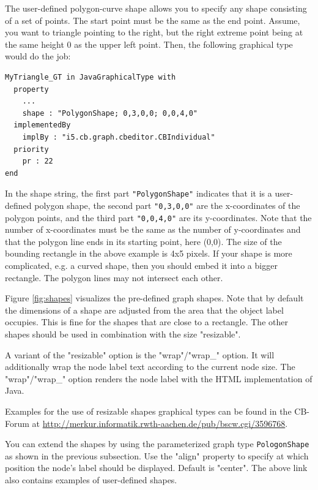 \vspace{0.7cm}


The user-defined polygon-curve shape allows you to specify any shape consisting of a 
set of points. The start point must be the same as the end point.
Assume, you want to triangle pointing to the right, but the right extreme point being at the same height 0
as the upper left point. Then, the following graphical type would do
the job:

{\small
\begin{verbatim}
MyTriangle_GT in JavaGraphicalType with  
  property
    ...
    shape : "PolygonShape; 0,3,0,0; 0,0,4,0"
  implementedBy
    implBy : "i5.cb.graph.cbeditor.CBIndividual"
  priority
    pr : 22
end 
\end{verbatim}
}

In the shape string, the first part {\tt "PolygonShape"} indicates that it is a user-defined
polygon shape, the second part {\tt "0,3,0,0"} are the x-coordinates of the polygon points,
and the third part {\tt "0,0,4,0"} are its y-coordinates. Note that the number of x-coordinates
must be the same as the number of y-coordinates and that the polygon line ends in its
starting point, here (0,0). The size of the bounding rectangle in the above example is 4x5 pixels.
If your shape is more complicated, e.g. a curved shape, then you should embed it into a 
bigger rectangle. 
The polygon lines may not intersect each other.




Figure \ref{fig:shapes} visualizes the pre-defined graph shapes. Note that
by default the dimensions of a shape are adjusted from the area that
the object label occupies. This is fine for the shapes that are close
to a rectangle. The other shapes should be used in combination with
the size "resizable".

A variant of the "resizable" option is the "wrap"/"wrap\_" option. It will additionally
wrap the node label text according to the current node size.
The "wrap"/"wrap\_" option renders the node label with the HTML implementation of Java.


Examples for the use of resizable shapes graphical types can be found in
the CB-Forum at
\url{http://merkur.informatik.rwth-aachen.de/pub/bscw.cgi/3596768}.


You can extend the shapes by using the parameterized graph type {\tt PologonShape}
as shown in the previous subsection. Use the "align" property to specify at which
position the node's label should be displayed. Default is "center".
The above link also contains examples of user-defined shapes. 




